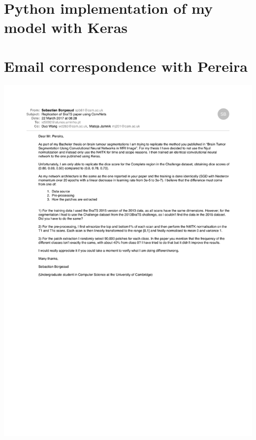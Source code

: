 \documentclass[12pt,a4paper,twoside,openright]{report}
\begin{document}


\chapter{Python implementation of my model with Keras}
\label{appendix:my_model}


\chapter{Email correspondence with Pereira}
\label{appendix:pereira_email}
\includegraphics[width=\textwidth]{email2.pdf}
\end{document}
